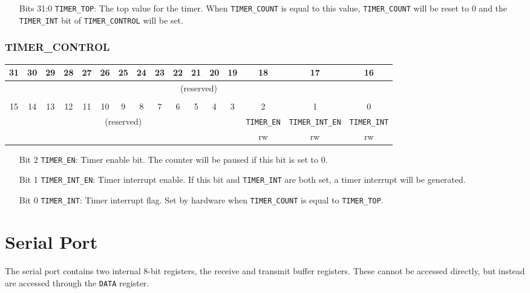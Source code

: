 \documentclass[11pt,openany]{report}
\begin{document}
\begin{enumerate}
  \item[Bits 31:0] \verb|TIMER_TOP|: The top value for the timer. When \verb|TIMER_COUNT|
              is equal to this value, \verb|TIMER_COUNT| will be reset to 0 and
              the \verb|TIMER_INT| bit of \verb|TIMER_CONTROL| will be set.
\end{enumerate}

\subsubsection{TIMER\_CONTROL}
\centering
\begin{tabular}{|c|c|c|c|c|c|c|c|c|c|c|c|c|c|c|c|}
  \hline
  31 & 30 & 29 & 28 & 27 & 26 & 25 & 24 & 23 & 22 & 21 & 20 & 19 & 18 & 17 & 16 \\
  \hline
  \multicolumn{16}{|c|}{\multirow{2}{*}{(reserved)}}\\
  \multicolumn{16}{|c|}{}\\
  \hline
  \multicolumn{16}{c}{}\\
  \hline
  15 & 14 & 13 & 12 & 11 & 10 & 9 & 8 & 7 & 6 & 5 & 4 & 3 & 2 & 1 & 0 \\
  \hline
  \multicolumn{13}{|c|}{\multirow{2}{*}{(reserved)}} & \texttt{TIMER\_EN} & \texttt{TIMER\_INT\_EN} & \texttt{TIMER\_INT} \\
  \cline{14-16}
  \multicolumn{13}{|c|}{} & rw & rw & rw\\
  \hline
\end{tabular}

\begin{enumerate}
  \item[Bit 2] \verb|TIMER_EN|: Timer enable bit. The counter will be paused if
    this bit is set to 0.
  \item[Bit 1] \verb|TIMER_INT_EN|: Timer interrupt enable. If this bit and
    \verb|TIMER_INT| are both set, a timer interrupt will be generated.
  \item[Bit 0] \verb|TIMER_INT|: Timer interrupt flag. Set by hardware
    when \verb|TIMER_COUNT| is equal to \verb|TIMER_TOP|.
\end{enumerate}

\section{Serial Port}

The serial port contains two internal 8-bit registers, the receive and
transmit buffer registers. These cannot be accessed directly, but instead
are accessed through the \verb|DATA| register.
\end{document}
